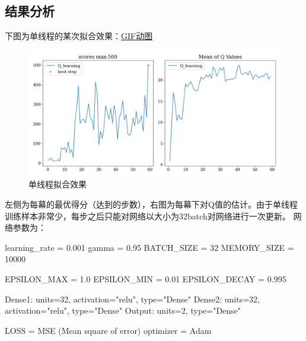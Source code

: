 \documentclass[12pt, a4paper, oneside]{ctexart}
\numberwithin{equation}{section}  %
\begin{document}
\subsection{结果分析}
下图为单线程的某次拟合效果：\href{https://imgloc.com/i/iSxhQU}{GIF动图}
\begin{figure}[H]
    \hspace{-1.3cm}
    \includegraphics[scale=0.6]{./figures/Cartpole/single_process.png}
    \caption{单线程拟合效果}
\end{figure}

左侧为每幕的最优得分（达到的步数），右图为每幕下对Q值的估计。由于单线程训练样本非常少，每步之后只能对网络以大小为$32$batch对网络进行一次更新。
网络参数为：
\begin{pythoncode}
    learning_rate = 0.001
    gamma = 0.95
    BATCH_SIZE = 32
    MEMORY_SIZE = 10000
    
    EPSILON_MAX = 1.0
    EPSILON_MIN = 0.01
    EPSILON_DECAY = 0.995

    Dense1: units=32, activation="relu", type="Dense"
    Dense2: units=32, activation="relu", type="Dense"
    Output:  units=2, type="Dense"

    LOSS = MSE (Mean square of error)
    optimizer = Adam
\end{pythoncode}
\end{document}
